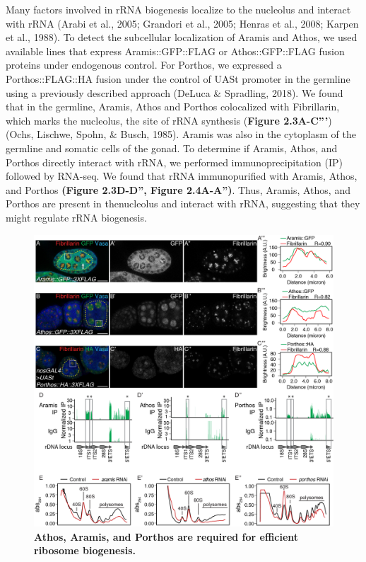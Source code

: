 \documentclass[12pt,oneside]{reedthesis}
\begin{document}
Many factors involved in rRNA biogenesis localize to the nucleolus and interact with rRNA (Arabi et al., 2005; Grandori et al., 2005; Henras et al., 2008; Karpen et al., 1988). To detect the subcellular localization of Aramis and Athos, we used available lines that express Aramis::GFP::FLAG or Athos::GFP::FLAG fusion proteins under endogenous control. For Porthos, we expressed a Porthos::FLAG::HA fusion under the control of UASt promoter in the germline using a previously described approach (DeLuca \& Spradling, 2018). We found that in the germline, Aramis, Athos and Porthos colocalized with Fibrillarin, which marks the nucleolus, the site of rRNA synthesis (\textbf{Figure 2.3A-C'''}) (Ochs, Lischwe, Spohn, \& Busch, 1985). Aramis was also in the cytoplasm of the germline and somatic cells of the gonad. To determine if Aramis, Athos, and Porthos directly interact with rRNA, we performed immunoprecipitation (IP) followed by RNA-seq. We found that rRNA immunopurified with Aramis, Athos, and Porthos \textbf{(Figure 2.3D-D'', Figure 2.4A-A'')}. Thus, Aramis, Athos, and Porthos are present in thenucleolus and interact with rRNA, suggesting that they might regulate rRNA biogenesis.
\begin{figure}

{\centering \includegraphics[width=1\linewidth]{./figure/Ribosome Biogenesis/Ribosome Biogenesis 2} 

}

\caption[\textbf{Athos, Aramis, and Porthos are required for efficient ribosome biogenesis.}]{\textbf{Athos, Aramis, and Porthos are required for efficient ribosome biogenesis.}}\label{fig:unnamed-chunk-10}
\end{figure}
\end{document}
